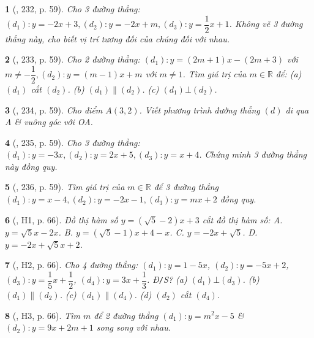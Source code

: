 \documentclass{article}
\newtheorem{baitoan}{}
\begin{document}
\begin{baitoan}[\cite{Tuyen_Toan_8}, 232, p. 59]
	Cho 3 đường thẳng: $(d_1):y = -2x + 3,(d_2):y = -2x + m,(d_3):y = \dfrac{1}{2}x + 1$. Không vẽ 3 đường thẳng này, cho biết vị trí tương đối của chúng đối với nhau.
\end{baitoan}

\begin{baitoan}[\cite{Tuyen_Toan_8}, 233, p. 59]
	Cho 2 đường thẳng: $(d_1):y = (2m + 1)x - (2m + 3)$ với $m\ne-\dfrac{1}{2},(d_2):y = (m - 1)x + m$ với $m\ne1$. Tìm giá trị của $m\in\mathbb{R}$ để: (a) $(d_1)$ cắt $(d_2)$. (b) $(d_1)\parallel(d_2)$. (c) $(d_1)\bot(d_2)$.
\end{baitoan}

\begin{baitoan}[\cite{Tuyen_Toan_8}, 234, p. 59]
	Cho điểm $A(3,2)$. Viết phương trình đường thẳng $(d)$ đi qua A \& vuông góc với OA.
\end{baitoan}

\begin{baitoan}[\cite{Tuyen_Toan_8}, 235, p. 59]
	Cho 3 đường thẳng: $(d_1):y = -3x,(d_2):y = 2x + 5,(d_3):y = x + 4$. Chứng minh 3 đường thẳng này đồng quy.
\end{baitoan}

\begin{baitoan}[\cite{Tuyen_Toan_8}, 236, p. 59]
	Tìm giá trị của $m\in\mathbb{R}$ để 3 đường thẳng $(d_1):y = x - 4,(d_2):y = -2x - 1,(d_3):y = mx + 2$ đồng quy.
\end{baitoan}

\begin{baitoan}[\cite{Binh_boi_duong_Toan_9_tap_1}, H1, p. 66]
	Đồ thị hàm số $y = (\sqrt{5} - 2)x + 3$ cắt đồ thị hàm số: {\sf A.} $y =  \sqrt{5}x - 2x$. {\sf B.} $y = (\sqrt{5} - 1)x + 4 - x$. {\sf C.} $y = -2x + \sqrt{5}$. {\sf D.} $y = -2x + \sqrt{5}x + 2$.
\end{baitoan}

\begin{baitoan}[\cite{Binh_boi_duong_Toan_9_tap_1}, H2, p. 66]
	Cho 4 đường thẳng: $ (d_1):y = 1 - 5x$, $ (d_2):y = -5x + 2$, $(d_3): y = \dfrac{1}{5}x + \dfrac{1}{2}$, $(d_4):y = 3x + \dfrac{1}{3}$. {\rm Đ{\tt/}S?} (a) $(d_1)\bot(d_3)$. (b) $(d_1)\parallel(d_2)$. (c) $(d_1)\parallel(d_4)$. (d) $(d_2)$ cắt $(d_4)$.
\end{baitoan}

\begin{baitoan}[\cite{Binh_boi_duong_Toan_9_tap_1}, H3, p. 66]
	Tìm $m$ để 2 đường thẳng $(d_1):y = m^2x - 5$ \& $(d_2):y = 9x + 2m + 1$ song song với nhau.
\end{baitoan}
\end{document}
